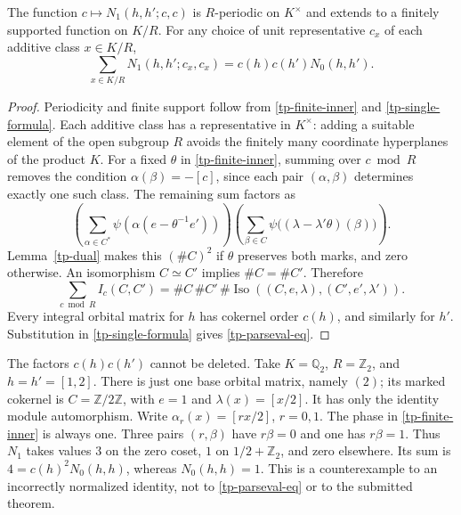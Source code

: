 \begin{theorem}\label{tp-parseval}
The function $c\mapsto N_1(h,h';c,c)$ is $R$-periodic on
$K^\times$ and extends to a finitely supported function on
$K/R$. For any choice of unit representative $c_x$ of each
additive class $x\in K/R$,
\begin{equation}\label{tp-parseval-eq}
 \sum_{x\in K/R}N_1(h,h';c_x,c_x)
                       =c(h)c(h')N_0(h,h').
\end{equation}
\end{theorem}

\begin{proof}
Periodicity and finite support follow from
\eqref{tp-finite-inner} and \eqref{tp-single-formula}.
Each additive class has a representative in $K^\times$:
adding a suitable element of the open subgroup $R$ avoids
the finitely many coordinate hyperplanes of the product $K$.
For a fixed $\theta$ in \eqref{tp-finite-inner}, summing over
$c\bmod R$ removes the condition $\alpha(\beta)=-[c]$, since
each pair $(\alpha,\beta)$ determines exactly one such class.
The remaining sum factors as
\[
 \left(\sum_{\alpha\in C^*}
       \psi(\alpha(e-\theta^{-1}e'))\right)
 \left(\sum_{\beta\in C}
       \psi\bigl((\lambda-\lambda'\theta)(\beta)\bigr)\right).
\]
Lemma~\ref{tp-dual} makes this $(\#C)^2$ if $\theta$ preserves
both marks, and zero otherwise. An isomorphism $C\simeq C'$
implies $\#C=\#C'$. Therefore
\[
 \sum_{c\bmod R}I_c(C,C')
       =\#C\,\#C'\,\#\operatorname{Iso}((C,e,\lambda),(C',e',\lambda')).
\]
Every integral orbital matrix for $h$ has cokernel order $c(h)$,
and similarly for $h'$. Substitution in \eqref{tp-single-formula}
gives \eqref{tp-parseval-eq}.
\end{proof}

\begin{example}\label{tp-factor-example}
The factors $c(h)c(h')$ cannot be deleted. Take
$K=\mathbb Q_2$, $R=\mathbb Z_2$, and $h=h'=[1,2]$.
There is just one base orbital matrix, namely $(2)$; its
marked cokernel is $C=\mathbb Z/2\mathbb Z$, with $e=1$
and $\lambda(x)=[x/2]$. It has only the identity module
automorphism. Write $\alpha_r(x)=[rx/2]$, $r=0,1$.
The phase in \eqref{tp-finite-inner} is always one.
Three pairs $(r,\beta)$ have $r\beta=0$ and one has
$r\beta=1$. Thus $N_1$ takes values $3$ on the zero coset,
$1$ on $1/2+\mathbb Z_2$, and zero elsewhere. Its sum is
$4=c(h)^2N_0(h,h)$, whereas $N_0(h,h)=1$.
This is a counterexample to an incorrectly normalized identity,
not to \eqref{tp-parseval-eq} or to the submitted theorem.
\end{example}

